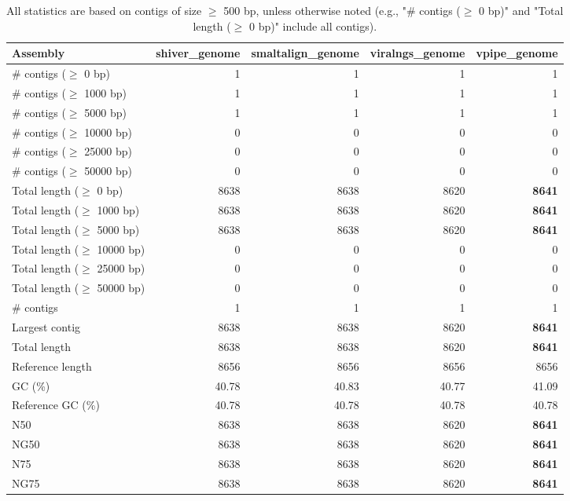 \documentclass[12pt,a4paper]{article}
\begin{document}
\begin{table}[ht]
\begin{center}
\caption{All statistics are based on contigs of size $\geq$ 500 bp, unless otherwise noted (e.g., "\# contigs ($\geq$ 0 bp)" and "Total length ($\geq$ 0 bp)" include all contigs).}
\begin{tabular}{|l*{4}{|r}|}
\hline
Assembly & shiver\_genome & smaltalign\_genome & viralngs\_genome & vpipe\_genome \\ \hline
\# contigs ($\geq$ 0 bp) & 1 & 1 & 1 & 1 \\ \hline
\# contigs ($\geq$ 1000 bp) & 1 & 1 & 1 & 1 \\ \hline
\# contigs ($\geq$ 5000 bp) & 1 & 1 & 1 & 1 \\ \hline
\# contigs ($\geq$ 10000 bp) & 0 & 0 & 0 & 0 \\ \hline
\# contigs ($\geq$ 25000 bp) & 0 & 0 & 0 & 0 \\ \hline
\# contigs ($\geq$ 50000 bp) & 0 & 0 & 0 & 0 \\ \hline
Total length ($\geq$ 0 bp) & 8638 & 8638 & 8620 & {\bf 8641} \\ \hline
Total length ($\geq$ 1000 bp) & 8638 & 8638 & 8620 & {\bf 8641} \\ \hline
Total length ($\geq$ 5000 bp) & 8638 & 8638 & 8620 & {\bf 8641} \\ \hline
Total length ($\geq$ 10000 bp) & 0 & 0 & 0 & 0 \\ \hline
Total length ($\geq$ 25000 bp) & 0 & 0 & 0 & 0 \\ \hline
Total length ($\geq$ 50000 bp) & 0 & 0 & 0 & 0 \\ \hline
\# contigs & 1 & 1 & 1 & 1 \\ \hline
Largest contig & 8638 & 8638 & 8620 & {\bf 8641} \\ \hline
Total length & 8638 & 8638 & 8620 & {\bf 8641} \\ \hline
Reference length & 8656 & 8656 & 8656 & 8656 \\ \hline
GC (\%) & 40.78 & 40.83 & 40.77 & 41.09 \\ \hline
Reference GC (\%) & 40.78 & 40.78 & 40.78 & 40.78 \\ \hline
N50 & 8638 & 8638 & 8620 & {\bf 8641} \\ \hline
NG50 & 8638 & 8638 & 8620 & {\bf 8641} \\ \hline
N75 & 8638 & 8638 & 8620 & {\bf 8641} \\ \hline
NG75 & 8638 & 8638 & 8620 & {\bf 8641} \\ \hline

\end{tabular}
\end{center}
\end{table}
\end{document}
